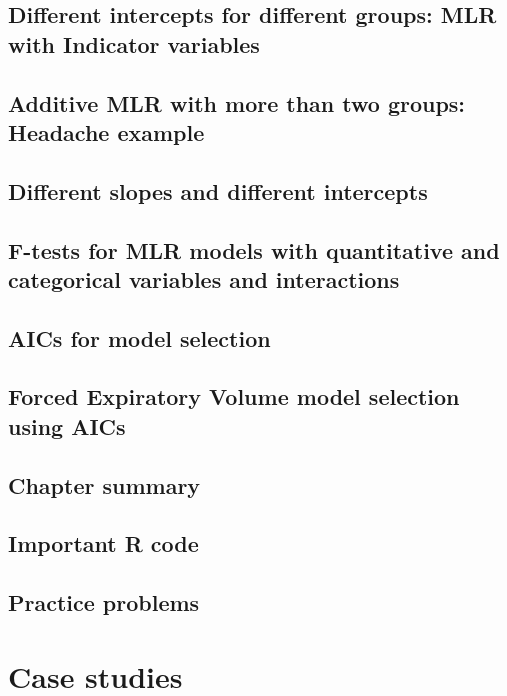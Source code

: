 \documentclass[]{book}
\begin{document}
{{\section{Different intercepts for different groups: MLR with Indicator
variables}\label{section8-9}

\section{Additive MLR with more than two groups: Headache
example}\label{section8-10}

\section{Different slopes and different intercepts}\label{section8-11}

\section{F-tests for MLR models with quantitative and categorical
variables and interactions}\label{section8-12}

\section{AICs for model selection}\label{section8-13}

\section{Forced Expiratory Volume model selection using
AICs}\label{section8-14}

\section{Chapter summary}\label{section8-15}

\section{Important R code}\label{section8-16}

\section{Practice problems}\label{section8-17}

\chapter{Case studies}\label{chapter9}

}}
\end{document}
